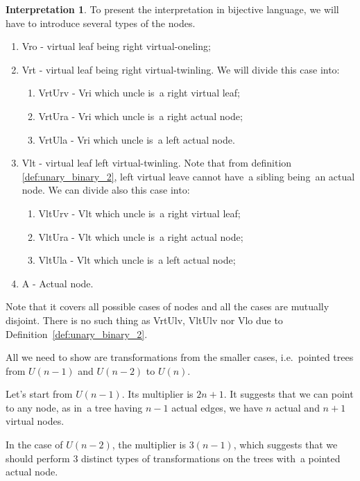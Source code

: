\documentclass[final]{article}
\theoremstyle{definition}
\theoremstyle{definition}
\newtheorem{interpretation}{Interpretation}[subsection]
\theoremstyle{remark}
\begin{document}
\begin{interpretation}
To present the interpretation in bijective language, we will have to introduce several types of the nodes.

\begin{enumerate}
    \item Vro - virtual leaf being right virtual-oneling;
    \item Vrt - virtual leaf being right virtual-twinling. We will divide this case into:
        \begin{enumerate}
            \item VrtUrv - Vri which uncle is~a right virtual leaf;
            \item VrtUra - Vri which uncle is~a right actual node;
            \item VrtUla - Vri which uncle is~a left actual node.
        \end{enumerate}
    \item Vlt - virtual leaf left virtual-twinling. Note that from definition \ref{def:unary_binary_2}, left virtual leave cannot have~a sibling being~an actual node. We can divide also this case into:
        \begin{enumerate}
            \item VltUrv - Vlt which uncle is~a right virtual leaf;
            \item VltUra - Vlt which uncle is~a right actual node;
            \item VltUla - Vlt which uncle is~a left actual node;
        \end{enumerate}
    \item A - Actual node.
\end{enumerate}

Note that it covers all possible cases of nodes and all the cases are mutually disjoint. There is no such thing as VrtUlv, VltUlv nor Vlo due to Definition~\ref{def:unary_binary_2}.

All we need to show are transformations from the smaller cases, i.e.~pointed trees from \(U(n-1)\) and \(U(n-2)\) to \(U(n)\).

Let's start from \(U(n-1)\). Its multiplier is \(2n + 1\). It suggests that we can point to any node, as in~a tree having \(n - 1\) actual edges, we have \(n\) actual and \(n + 1\) virtual nodes.

In the case of \(U(n-2)\), the multiplier is \(3(n-1)\), which suggests that we should perform \(3\) distinct types of transformations on the trees with~a pointed actual node.


\end{interpretation}
\end{document}
